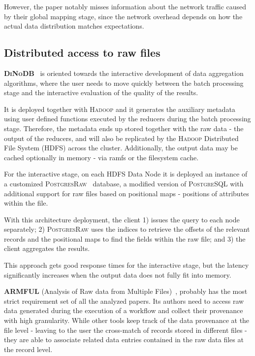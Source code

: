 However, the paper notably misses information about the network traffic caused 
by their global mapping stage, since the network overhead depends on how the 
actual data distribution matches \scidb expectations.


\subsection{Distributed access to raw files}
\textbf{\textsc{DiNoDB}}~\cite{Tian2014} is oriented towards the interactive development
of data aggregation algorithms, where the user needs to move quickly between 
the batch processing stage and the interactive evaluation of the quality of 
the results.

It is deployed together with \textsc{Hadoop} and it generates the auxiliary metadata 
using user defined functions executed by the reducers during the batch 
processing stage. Therefore, the metadata ends up stored together with the raw 
data - the output of the reducers, and will also be replicated by the \textsc{Hadoop} 
Distributed File System (\textsc{HDFS}) across the cluster. Additionally, the output 
data may be cached optionally in memory - via ramfs or the filesystem cache.

For the interactive stage, on each HDFS Data Node it is deployed an 
instance of a customized \textsc{PostgresRaw}~\cite{Alagiannis2012Adaptive}
database, a modified version of \textsc{PostgreSQL} with additional support for 
raw files based on positional maps - positions of attributes within the file.

With this architecture deployment, the client 1) issues the query to each 
node separately; 2) \textsc{PostgresRaw} uses the indices to retrieve the offsets of the 
relevant records and the positional maps to find the fields within the 
raw file; and 3) the client aggregates the results.

This approach gets good response times for the interactive stage,
but the latency significantly increases when the output data does not 
fully fit into memory.

\medskip

\textbf{ARMFUL}  (Analysis of Raw data from Multiple Files)~\cite{Silva2017}, 
probably has the most strict requirement set of all the analyzed papers. Its 
authors need to access raw data generated during the execution of a 
workflow and collect their provenance with high granularity. While other 
tools keep track of the data provenance at the file level - leaving to the user 
the cross-match of records stored in different files - they are able to 
associate related data entries contained in the raw data files at the record 
level.

